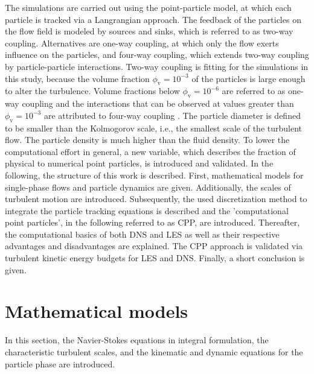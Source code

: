 \documentclass[11pt,a4paper,openany,oneside,parskip=half*]{article}
\begin{document}
\newline
The simulations are carried out using the point-particle model, at which each particle is tracked via a Langrangian approach. The feedback of the particles on the flow field is modeled by sources and sinks, which is referred to as two-way coupling. Alternatives are one-way coupling, at which only the flow exerts influence on the particles, and four-way coupling, which extends two-way coupling by particle-particle interactions. Two-way coupling is fitting for the simulations in this study, because the volume fraction $\phi_\mathrm{v}= 10^{-3}$ of the particles is large enough to alter the turbulence. Volume fractions below $\phi_\mathrm{v}= 10^{-6}$ are referred to as one-way coupling and the interactions that can be observed at values greater than $\phi_\mathrm{v}= 10^{-3}$ are attributed to four-way coupling \cite{particleladenTurbulentFlows:DirectSimulationAndClosureModels, OnPredictingParticle-LadenTurbulentFlows}.
The particle diameter is defined to be smaller than the Kolmogorov scale, i.e., the smallest scale of the turbulent flow. The particle density is much higher than the fluid density.
\newline
To lower the computational effort in general, a new variable, which describes the fraction of physical to numerical point particles, is introduced and validated.
\newline
In the following, the structure of this work is described. 
First, mathematical models for single-phase flows and particle dynamics are given. 
Additionally, the scales of turbulent motion are introduced.
Subsequently, the used discretization method to integrate the particle tracking equations is described and the 'computational point particles', in the following referred to as CPP, are introduced.
Thereafter, the computational basics of both DNS and LES as well as their respective advantages and disadvantages are explained. 
The CPP approach is validated via turbulent kinetic energy budgets for LES and DNS.
Finally, a short conclusion is given.
\pagebreak
\section{Mathematical models}
In this section, the Navier-Stokes equations in integral formulation, the characteristic turbulent scales, and the kinematic and dynamic equations for the particle phase are introduced.
\newline
\end{document}
